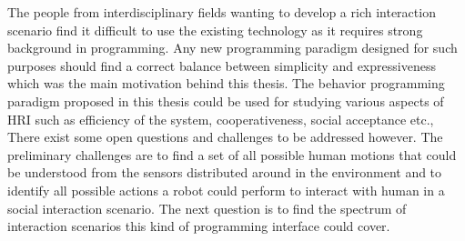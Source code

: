 The people from interdisciplinary fields wanting to develop a rich interaction scenario find it difficult to use the existing technology as it requires strong background in programming. Any new programming paradigm designed for such purposes should find a correct balance between simplicity and expressiveness which was the main motivation behind this thesis. The behavior programming paradigm proposed in this thesis could be used for studying various aspects of HRI such as efficiency of the system, cooperativeness, social acceptance etc., There exist some open questions and challenges to be addressed however. The preliminary challenges are to find a set of all possible human motions that could be understood from the sensors distributed around in the environment and to identify all possible actions a robot could perform to interact with human in a social interaction scenario. The next question is to find the spectrum of interaction scenarios this kind of programming interface could cover. 